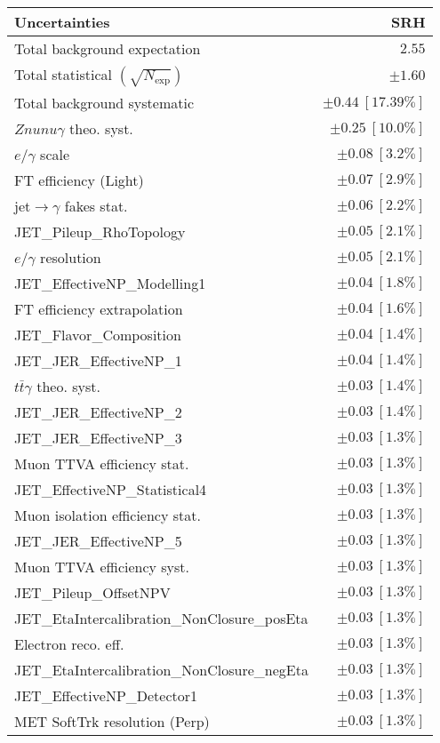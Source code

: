 \begin{tabular}{lr}
\hline
\textbf{Uncertainties} & \textbf{SRH} \\
\hline
Total background expectation & $2.55$ \\
\hline
Total statistical $(\sqrt{N_\mathrm{exp}})$ & $\pm 1.60$ \\
Total background systematic & $\pm 0.44\ [17.39\%]$ \\
\hline
\hline
$Znunu\gamma$ theo. syst. & $\pm 0.25\ [10.0\%]$ \\
$e/\gamma$ scale & $\pm 0.08\ [3.2\%]$ \\
FT efficiency (Light) & $\pm 0.07\ [2.9\%]$ \\
jet$\to\gamma$ fakes stat. & $\pm 0.06\ [2.2\%]$ \\
JET\_Pileup\_RhoTopology & $\pm 0.05\ [2.1\%]$ \\
$e/\gamma$ resolution & $\pm 0.05\ [2.1\%]$ \\
JET\_EffectiveNP\_Modelling1 & $\pm 0.04\ [1.8\%]$ \\
FT efficiency extrapolation & $\pm 0.04\ [1.6\%]$ \\
JET\_Flavor\_Composition & $\pm 0.04\ [1.4\%]$ \\
JET\_JER\_EffectiveNP\_1 & $\pm 0.04\ [1.4\%]$ \\
$t\bar{t}\gamma$ theo. syst. & $\pm 0.03\ [1.4\%]$ \\
JET\_JER\_EffectiveNP\_2 & $\pm 0.03\ [1.4\%]$ \\
JET\_JER\_EffectiveNP\_3 & $\pm 0.03\ [1.3\%]$ \\
Muon TTVA efficiency stat. & $\pm 0.03\ [1.3\%]$ \\
JET\_EffectiveNP\_Statistical4 & $\pm 0.03\ [1.3\%]$ \\
Muon isolation efficiency stat. & $\pm 0.03\ [1.3\%]$ \\
JET\_JER\_EffectiveNP\_5 & $\pm 0.03\ [1.3\%]$ \\
Muon TTVA efficiency syst. & $\pm 0.03\ [1.3\%]$ \\
JET\_Pileup\_OffsetNPV & $\pm 0.03\ [1.3\%]$ \\
JET\_EtaIntercalibration\_NonClosure\_posEta & $\pm 0.03\ [1.3\%]$ \\
Electron reco. eff. & $\pm 0.03\ [1.3\%]$ \\
JET\_EtaIntercalibration\_NonClosure\_negEta & $\pm 0.03\ [1.3\%]$ \\
JET\_EffectiveNP\_Detector1 & $\pm 0.03\ [1.3\%]$ \\
MET SoftTrk resolution (Perp) & $\pm 0.03\ [1.3\%]$ \\

\end{tabular}
